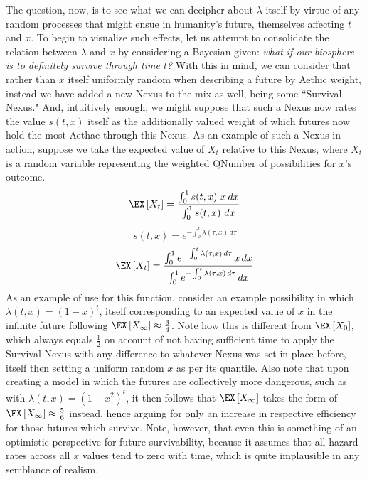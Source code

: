 The question, now, is to see what we can decipher about $\lambda$ itself by virtue of any random processes that might ensue in humanity's future, themselves affecting $t$ and $x$. To begin to visualize such effects, let us attempt to consolidate the relation between $\lambda$ and $x$ by considering a Bayesian given: \textit{what if our biosphere is to definitely survive through time $t$?} With this in mind, we can consider that rather than $x$ itself uniformly random when describing a future by Aethic weight, instead we have added a new Nexus to the mix as well, being some ``Survival Nexus." And, intuitively enough, we might suppose that such a Nexus now rates the value $s \! \left( t, x \right)$ itself as the additionally valued weight of which futures now hold the most Aethae through this Nexus. As an example of such a Nexus in action, suppose we take the expected value of $X_t$ relative to this Nexus, where $X_t$ is a random variable representing the weighted QNumber of possibilities for $x$'s outcome. 
\begin{equation}
    \EX \left[ X_t \right] = \frac{\int_0^1 s \! \left( t, x \right) \, x \, dx}{\int_0^1 s \! \left( t, x \right) \, dx}
\end{equation}
\begin{equation}
    s \! \left( t, x \right) = e^{-\int_0^{t} \lambda \left( \tau, x \right) \, d\tau}
\end{equation}
\begin{equation}
    \EX \left[ X_t \right] = \frac{\int_0^1 e^{-\int_0^{t} \lambda \left( \tau, x \right) \, d\tau} \, x \, dx}{\int_0^1 e^{-\int_0^{t} \lambda \left( \tau, x \right) \, d\tau} \, dx}
\end{equation}
As an example of use for this function, consider an example possibility in which $\lambda \! \left( t, x \right) = {\left( 1 - x \right)}^{t}$, itself corresponding to an expected value of $x$ in the infinite future following $\EX \left[ X_\infty \right] \approx \frac{3}{4}$. Note how this is different from $\EX \left[ X_0 \right]$, which always equals $\frac{1}{2}$ on account of not having sufficient time to apply the Survival Nexus with any difference to whatever Nexus was set in place before, itself then setting a uniform random $x$ as per its quantile. Also note that upon creating a model in which the futures are collectively more dangerous, such as with $\lambda \! \left( t, x \right) = {\left( 1 - x^2 \right)}^{t}$, it then follows that $\EX \left[ X_\infty \right]$ takes the form of $\EX \left[ X_\infty \right] \approx \frac{5}{6}$ instead, hence arguing for only an increase in respective efficiency for those futures which survive. Note, however, that even this is something of an optimistic perspective for future survivability, because it assumes that all hazard rates across all $x$ values tend to zero with time, which is quite implausible in any semblance of realism.

